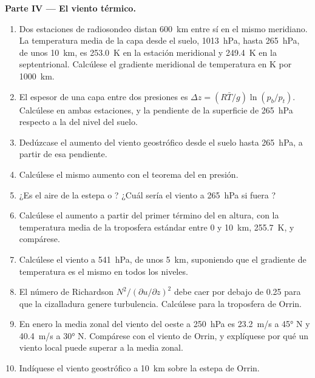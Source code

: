 \begin{problem}
\medskip\noindent\textbf{Parte IV --- El viento térmico.}
\begin{enumerate}[resume]
\item Dos estaciones de radiosondeo distan \qty{600}{km} entre sí en el mismo
  meridiano. La temperatura media de la capa desde el suelo,
  \qty{1013}{hPa}, hasta \qty{265}{hPa}, de unos \qty{10}{km}, es \qty{253.0}{K}
  en la estación meridional y \qty{249.4}{K} en la septentrional. Calcúlese el
  gradiente meridional de temperatura en \unit{K} por \qty{1000}{km}.
\item El espesor de una capa entre dos presiones es $\Delta z = (R\bar
  T/g)\ln(p_b/p_t)$. Calcúlese en ambas estaciones, y la pendiente de la
  superficie de \qty{265}{hPa} respecto a la del nivel del suelo.
\item Dedúzcase el aumento del viento geostrófico desde el suelo hasta
  \qty{265}{hPa}, a partir de esa pendiente.
\item Calcúlese el mismo aumento con el teorema del  en presión.
\item ¿Es el aire de la estepa  o ? ¿Cuál sería el viento
  a \qty{265}{hPa} si fuera ?
\item Calcúlese el aumento a partir del primer término del  en
  altura, con la temperatura media de la troposfera estándar entre 0
  y \qty{10}{km}, \qty{255.7}{K}, y compárese.
\item Calcúlese el viento a \qty{541}{hPa}, de unos \qty{5}{km}, suponiendo que el
  gradiente de temperatura es el mismo en todos los niveles.
\item El número de Richardson $N^2/(\partial u/\partial z)^2$ debe caer por debajo de
  0.25 para que la cizalladura genere turbulencia. Calcúlese para la troposfera de
  Orrin.
\item En enero la media zonal del viento del oeste a \qty{250}{hPa} es \qty{23.2}{m/s}
  a \ang{45} N y \qty{40.4}{m/s} a \ang{30} N. Compárese con el viento de
  Orrin, y explíquese por qué un viento local puede superar a la media zonal.
\item Indíquese el viento geostrófico a \qty{10}{km} sobre la estepa de Orrin.
\end{enumerate}
\end{problem}
